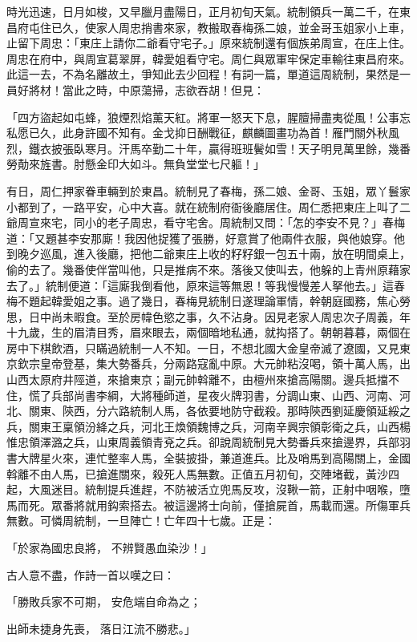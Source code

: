 \begin{showcontents}{}
時光迅速，日月如梭，又早臘月盡陽日，正月初旬天氣。統制領兵一萬二千，在東昌府屯住已久，使家人周忠捎書來家，教搬取春梅孫二娘，並金哥玉姐家小上車，止留下周忠：「東庄上請你二爺看守宅子。」原來統制還有個族弟周宣，在庄上住。周忠在府中，與周宣葛翠屏，韓愛姐看守宅。周仁與眾軍牢保定車輸往東昌府來。此這一去，不為名離故土，爭知此去少回程！有詞一篇，單道這周統制，果然是一員好將材！當此之時，中原蕩掃，志欲吞胡！但見：

「四方盜起如屯蜂，狼煙烈焰薰天紅。將軍一怒天下息，腥膻掃盡夷從風！公事忘私愿已久，此身許國不知有。金戈抑日酬戰征，麒麟圖畫功為首！雁門關外秋風烈，鐵衣披張臥寒月。汗馬卒勤二十年，贏得班班鬢如雪！天子明見萬里餘，幾番勞勣來旌書。肘懸金印大如斗。無負堂堂七尺軀！」

有日，周仁押家眷車輛到於東昌。統制見了春梅，孫二娘、金哥、玉姐，眾丫鬟家小都到了，一路平安，心中大喜。就在統制府衙後廳居住。周仁悉把東庄上叫了二爺周宣來宅，同小的老子周忠，看守宅舍。周統制又問：「怎的李安不見？」春梅道：「又題甚李安那廝！我因他捉獲了張勝，好意賞了他兩件衣服，與他娘穿。他到晚夕巡風，進入後廳，把他二爺東庄上收的籽籽銀一包五十兩，放在明間桌上，偷的去了。幾番使伴當叫他，只是推病不來。落後又使叫去，他躲的上青州原藉家去了。」統制便道：「這廝我倒看他，原來這等無恩！等我慢慢差人拏他去。」這春梅不題起韓愛姐之事。過了幾日，春梅見統制日遂理論軍情，幹朝庭國務，焦心勞思，日中尚未暇食。至於房幃色慾之事，久不沾身。因見老家人周忠次子周義，年十九歲，生的眉清目秀，眉來眼去，兩個暗地私通，就抅搭了。朝朝暮暮，兩個在房中下棋飲酒，只瞞過統制一人不知。一日，不想北國大金皇帝滅了遼國，又見東京欽宗皇帝登基，集大勢番兵，分兩路寇亂中原。大元帥粘沒喝，領十萬人馬，出山西太原府井陘道，來搶東京；副元帥斡離不，由檀州來搶高陽關。邊兵抵擋不住，慌了兵部尚書李綱，大將種師道，星夜火牌羽書，分調山東、山西、河南、河北、關東、陝西，分六路統制人馬，各依要地防守截殺。那時陝西劉延慶領延綏之兵，關東王稟領汾絳之兵，河北王煥領魏博之兵，河南辛興宗領彰衛之兵，山西楊惟忠領澤潞之兵，山東周義領青兗之兵。卻說周統制見大勢番兵來搶邊界，兵部羽書大牌星火來，連忙整率人馬，全裝披掛，兼道進兵。比及哨馬到高陽關上，金國斡離不由人馬，已搶進關來，殺死人馬無數。正值五月初旬，交陣堵截，黃沙四起，大風迷目。統制提兵進趕，不防被活立兜馬反攻，沒鞦一箭，正射中咽喉，墮馬而死。眾番將就用鈎索搭去。被這邊將士向前，僅搶屍首，馬載而還。所傷軍兵無數。可憐周統制，一旦陣亡！亡年四十七歲。正是：

「於家為國忠良將，  不辨賢愚血染沙！」

古人意不盡，作詩一首以嘆之曰：

「勝敗兵家不可期，  安危端自命為之；

出師未捷身先喪，  落日江流不勝悲。」


\end{showcontents}
